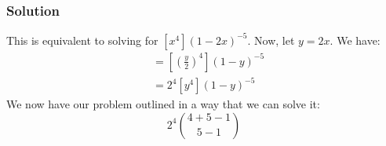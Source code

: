 \documentclass{report}
\begin{document}
\subsubsection{Solution}
This is equivalent to solving for $[x^4](1-2x)^{-5}$. Now, let $y = 2x$. We have:
\begin{align*}
&= \left[\left(\frac{y}{2}\right)^4\right](1-y)^{-5} \\
&= 2^4[y^4](1-y)^{-5}
\end{align*}
We now have our problem outlined in a way that we can solve it:
$$2^4{4+5-1 \choose 5-1}$$
\end{document}
